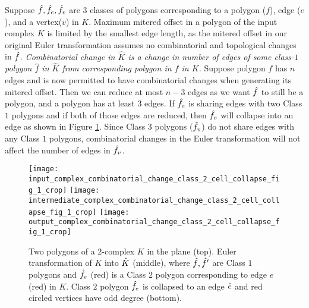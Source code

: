 Suppose $\hat{f}, \hat{f}_e, \hat{f}_v$ are $3$ classes of polygons corresponding to a polygon ($f$), edge ($e$), and a vertex($v$) in $K$.
Maximum mitered offset in a polygon of the input complex $K$ is limited by the smallest edge length, as the mitered offset in our original Euler transformation assumes no combinatorial and topological changes in $\hat{f}$.
\textit{Combinatorial change in $\hat{K}$ is a change in number of edges of some class-$1$ polygon $\hat{f}$ in $\hat{K}$ from corresponding polygon in $f$ in $K$.} 
Suppose polygon $f$ has $n$ edges and is now permitted to have combinatorial changes when generating its mitered offset.
Then we can reduce at most $n-3$ edges as we want $\hat{f}$ to still be a polygon, and a polygon has at least $3$ edges.
If $\hat{f}_e$ is sharing edges with two Class $1$ polygons and if both of those edges are reduced, then $\hat{f}_e$ will collapse into an edge as shown in Figure \ref{fig:eulertransfecollapse}.
Since Class $3$ polygons ($\hat{f}_v$) do not share edges with any Class $1$ polygons, combinatorial changes in the Euler transformation will not affect the number of edges in $\hat{f}_v$.
%
\begin{figure}[ht!] 
  \centering
  \texttt{[image: input\_complex\_combinatorial\_change\_class\_2\_cell\_collapse\_fig\_1\_crop]}
  \quad
  \texttt{[image: intermediate\_complex\_combinatorial\_change\_class\_2\_cell\_collapse\_fig\_1\_crop]}
  \quad
  \texttt{[image: output\_complex\_combinatorial\_change\_class\_2\_cell\_collapse\_fig\_1\_crop]}
  \caption{\label{fig:eulertransfecollapse}
    Two polygons of a $2$-complex $K$ in the plane (top).
    Euler transformation of $K$ into $\hat{K}$ (middle), where $\hat{f}, \hat{f}'$ are Class $1$ polygons and $\hat{f}_e$ (red) is a Class $2$ polygon corresponding to edge $e$ (red) in $K$.
    Class $2$ polygon $\hat{f}_e$ is collapsed to an edge $\hat{e}$ and red circled vertices have odd degree (bottom).
  }
\end{figure}

